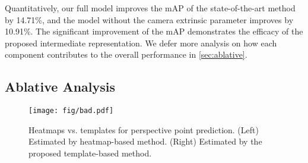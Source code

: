 \documentclass{article}
\begin{document}
Quantitatively, our full model improves the mAP of the state-of-the-art method~\cite{huang2018cooperative} by 14.71\%, and the model without the camera extrinsic parameter improves by 10.91\%. The significant improvement of the mAP demonstrates the efficacy of the proposed intermediate representation. We defer more analysis on how each component contributes to the overall performance in \autoref{sec:ablative}.

\begin{table}[b!]
    \caption{Comparisons of 3D object detection on SUN RGB-D (AP).}
    \setlength{\tabcolsep}{4pt}
    \centering
    \label{tab:detection_img}
\end{table}

\subsection{Ablative Analysis}
\label{sec:ablative}

\begin{figure}[t!]
    \begin{center}
        \texttt{[image: fig/bad.pdf]}
    \end{center}
    \vspace{-6pt}
    \caption{Heatmaps vs. templates for perspective point prediction. (Left) Estimated by heatmap-based method. (Right) Estimated by the proposed template-based method.}
    \label{fig:heatmap}
\end{figure}
\end{document}
